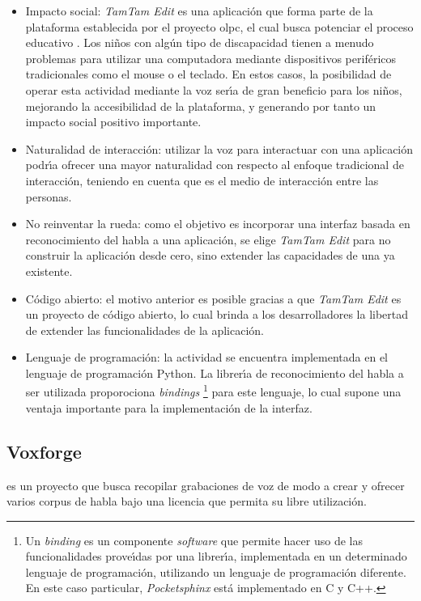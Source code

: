 \begin{itemize}
    \item Impacto social: \emph{TamTam Edit} es una aplicaci\'on que forma parte de la plataforma establecida
    por el proyecto \gls{olpc}, el cual busca potenciar el proceso educativo \cite{OLPC}. 
    Los ni\~nos con alg\'un tipo de discapacidad tienen a menudo problemas para utilizar una computadora mediante
    dispositivos perif\'ericos tradicionales como el mouse o el teclado. 
    En estos casos, la posibilidad de operar esta actividad mediante la voz ser{\'\i}a de gran beneficio 
    para los ni\~nos, mejorando la accesibilidad de la plataforma, y generando por tanto un impacto social
    positivo importante.
    \item Naturalidad de interacci\'on: utilizar la voz para interactuar con una aplicaci\'on podr{\'\i}a
    ofrecer una mayor naturalidad con respecto al enfoque tradicional de interacci\'on, teniendo en cuenta
    que es el medio de interacci\'on entre las personas.
    \item No reinventar la rueda: como el objetivo es incorporar una interfaz basada en reconocimiento del
    habla a una aplicaci\'on, se elige \emph{TamTam Edit} para no construir la aplicaci\'on desde cero, sino 
    extender las capacidades de una ya existente.
    \item C\'odigo abierto: el motivo anterior es posible gracias a que \emph{TamTam Edit} es un proyecto de 
    c\'odigo abierto, lo cual brinda a los desarrolladores la libertad de extender las funcionalidades de la 
    aplicaci\'on.
    \item Lenguaje de programaci\'on: la actividad se encuentra implementada en el lenguaje de programaci\'on
    Python. La librer{\'\i}a de reconocimiento del habla a ser utilizada proporociona \emph{bindings} 
    \footnote{Un \emph{binding} es un componente \emph{software}
   que permite hacer uso de las funcionalidades prove{\'\i}das por una librer{\'\i}a, implementada
    en un determinado lenguaje de programaci\'on, utilizando un lenguaje de programaci\'on diferente. 
    En este caso particular, \emph{Pocketsphinx} est\'a implementado en C y C++.} para 
    este lenguaje, lo cual supone una ventaja importante para la implementaci\'on de la interfaz.
\end{itemize}


\subsection{Voxforge}
 es un proyecto que busca recopilar grabaciones de voz de modo a crear 
y ofrecer varios corpus de habla bajo una licencia que permita su libre utilizaci\'on. 

